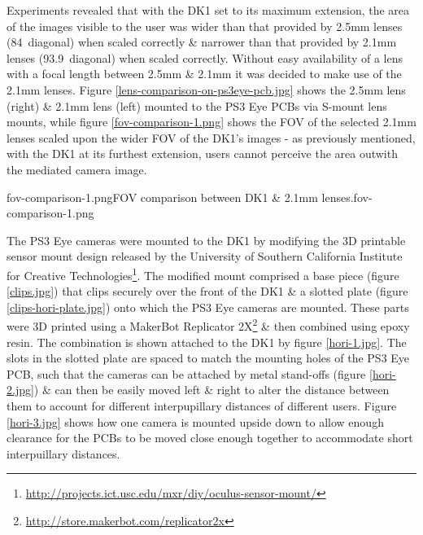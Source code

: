 Experiments revealed that with the DK1 set to its maximum extension, the area of the images visible to the user was wider than that provided by 2.5mm lenses (84\textdegree\ diagonal) when scaled correctly \& narrower than that provided by 2.1mm lenses (93.9\textdegree\ diagonal) when scaled correctly. Without easy availability of a lens with a focal length between 2.5mm \& 2.1mm it was decided to make use of the 2.1mm lenses. Figure \ref{lens-comparison-on-ps3eye-pcb.jpg} shows the 2.5mm lens (right) \& 2.1mm lens (left) mounted to the PS3 Eye PCBs via S-mount lens mounts, while figure \ref{fov-comparison-1.png} shows the FOV of the selected 2.1mm lenses scaled upon the wider FOV of the DK1's images - as previously mentioned, with the DK1 at its furthest extension, users cannot perceive the area outwith the mediated camera image.

       {fov-comparison-1.png}{FOV comparison between DK1 \& 2.1mm lenses.}{fov-comparison-1.png}


The PS3 Eye cameras were mounted to the DK1 by modifying the 3D printable sensor mount design released by the University of Southern California Institute for Creative Technologies\footnote{\url{http://projects.ict.usc.edu/mxr/diy/oculus-sensor-mount/}}. The modified mount comprised a base piece (figure \ref{clips.jpg}) that clips securely over the front of the DK1 \& a slotted plate (figure \ref{clips-hori-plate.jpg}) onto which the PS3 Eye cameras are mounted. These parts were 3D printed using a MakerBot Replicator 2X\footnote{\url{http://store.makerbot.com/replicator2x}} \& then combined using epoxy resin. The combination is shown attached to the DK1 by figure \ref{hori-1.jpg}. The slots in the slotted plate are spaced to match the mounting holes of the PS3 Eye PCB, such that the cameras can be attached by metal stand-offs (figure \ref{hori-2.jpg}) \& can then be easily moved left \& right to alter the distance between them to account for different interpupillary distances of different users. Figure \ref{hori-3.jpg} shows how one camera is mounted upside down to allow enough clearance for the PCBs to be moved close enough together to accommodate short interpuillary distances.

